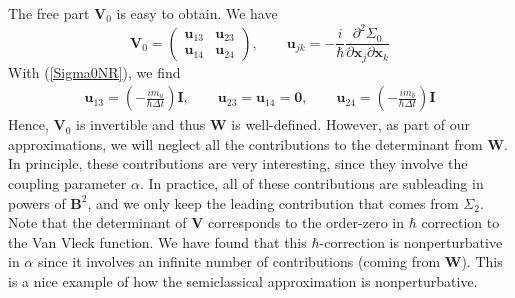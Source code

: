The free part $\mathbf{V}_{0}$ is easy to obtain. We have
\begin{equation}
	\mathbf{V}_{0} = \begin{pmatrix}
	\mathbf{u}_{13} & \mathbf{u}_{23} \\
	\mathbf{u}_{14} & \mathbf{u}_{24}
	\end{pmatrix}, \qquad \mathbf{u}_{jk} = - \frac{i}{\hbar} \frac{\partial^{2} \Sigma_{0}}{\partial \mathbf{x}_{j} \partial \mathbf{x}_{k}}
\end{equation}
With (\ref{Sigma0NR}), we find
\begin{equation}
\begin{split}
	\mathbf{u}_{13} = \left(- \frac{i m_{a}}{\hbar \Delta t} \right) \mathbf{I}, \qquad \mathbf{u}_{23} = \mathbf{u}_{14} = \mathbf{0}, \qquad \mathbf{u}_{24} = \left(- \frac{i m_{b}}{\hbar \Delta t} \right) \mathbf{I}
\end{split}
\end{equation}
Hence, $\mathbf{V}_{0}$ is invertible and thus $\mathbf{W}$ is well-defined. However, as part of our approximations, we will neglect all the contributions to the determinant from $\mathbf{W}$. In principle, these contributions are very interesting, since they involve the coupling parameter $\alpha$. In practice, all of these contributions are subleading in powers of $\mathbf{B}^{2}$, and we only keep the leading contribution that comes from $\Sigma_{2}$. Note that the determinant of $\mathbf{V}$ corresponds to the order-zero in $\hbar$ correction to the Van Vleck function. We have found that this $\hbar$-correction is nonperturbative in $\alpha$ since it involves an infinite number of contributions (coming from $\mathbf{W}$). This is a nice example of how the semiclassical approximation is nonperturbative.
